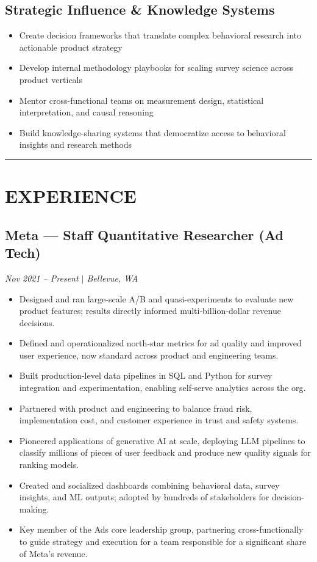 \documentclass[11pt,a4paper]{article}
\newcommand{\sepline}{\noindent\rule{\textwidth}{0.5pt}\vspace{0.5em}}
\begin{document}
\subsection*{Strategic Influence \& Knowledge Systems}
\begin{itemize}
    \item Create decision frameworks that translate complex behavioral research into actionable product strategy
    \item Develop internal methodology playbooks for scaling survey science across product verticals
    \item Mentor cross-functional teams on measurement design, statistical interpretation, and causal reasoning
    \item Build knowledge-sharing systems that democratize access to behavioral insights and research methods
\end{itemize}

\vspace{0.5em}
\sepline

\section*{EXPERIENCE}

\subsection*{Meta --- Staff Quantitative Researcher (Ad Tech)}
\textit{Nov 2021 -- Present $\mid$ Bellevue, WA}
\begin{itemize}
    \item Designed and ran large-scale A/B and quasi-experiments to evaluate new product features; results directly informed multi‑billion‑dollar revenue decisions.
    \item Defined and operationalized north‑star metrics for ad quality and improved user experience, now standard across product and engineering teams.
    \item Built production-level data pipelines in SQL and Python for survey integration and experimentation, enabling self-serve analytics across the org.
    \item Partnered with product and engineering to balance fraud risk, implementation cost, and customer experience in trust and safety systems.
    \item Pioneered applications of generative AI at scale, deploying LLM pipelines to classify millions of pieces of user feedback and produce new quality signals for ranking models.
    \item Created and socialized dashboards combining behavioral data, survey insights, and ML outputs; adopted by hundreds of stakeholders for decision-making.
    \item Key member of the Ads core leadership group, partnering cross-functionally to guide strategy and execution for a team responsible for a significant share of Meta's revenue.
\end{itemize}
\end{document}

